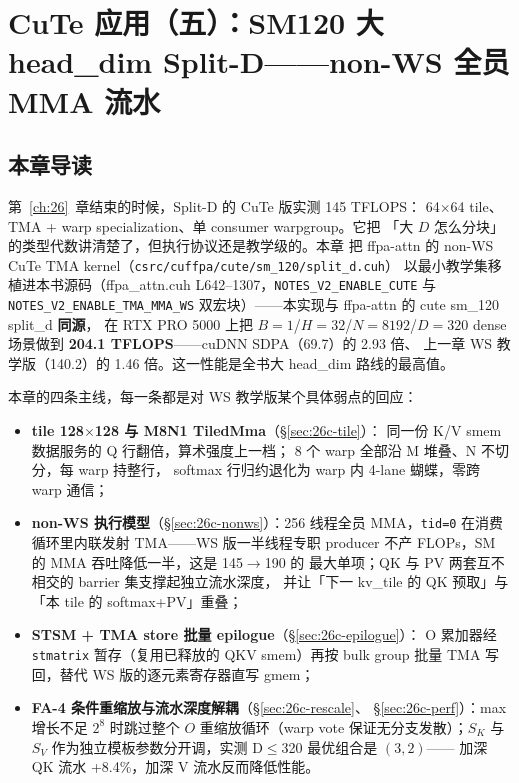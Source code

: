 \chapter{CuTe 应用（五）：SM120 大 head\_dim Split-D——non-WS 全员 MMA 流水}\label{ch:26c}

\section{本章导读}

第~\ref{ch:26}~章结束的时候，Split-D 的 CuTe 版实测 145 TFLOPS：
64$\times$64 tile、TMA + warp specialization、单 consumer warpgroup。它把
「大 $D$ 怎么分块」的类型代数讲清楚了，但执行协议还是教学级的。本章
把 ffpa-attn 的 non-WS CuTe TMA kernel（\texttt{csrc/cuffpa/cute/sm\_120/split\_d.cuh}）
以最小教学集移植进本书源码（ffpa\_attn.cuh L642--1307，\texttt{NOTES\_\allowbreak{}V2\_\allowbreak{}ENABLE\_\allowbreak{}CUTE}
与 \texttt{NOTES\_\allowbreak{}V2\_\allowbreak{}ENABLE\_\allowbreak{}TMA\_\allowbreak{}MMA\_\allowbreak{}WS}
双宏块）——本实现与 ffpa-attn 的 cute sm\_120 split\_d \textbf{同源}，
在 RTX PRO 5000 上把 $B{=}1$/$H{=}32$/$N{=}8192$/$D{=}320$
dense 场景做到 \textbf{204.1 TFLOPS}——cuDNN SDPA（69.7）的 2.93 倍、
上一章 WS 教学版（140.2）的 1.46 倍。这一性能是全书大 head\_dim 路线的最高值。

本章的四条主线，每一条都是对 WS 教学版某个具体弱点的回应：

\begin{itemize}[itemsep=1pt,topsep=2pt]
  \item \textbf{tile 128$\times$128 与 M8N1 TiledMma}（\S\ref{sec:26c-tile}）：
        同一份 K/V smem 数据服务的 Q 行翻倍，算术强度上一档；
        8 个 warp 全部沿 M 堆叠、N 不切分，每 warp 持整行，
        softmax 行归约退化为 warp 内 4-lane 蝴蝶，零跨 warp 通信；
  \item \textbf{non-WS 执行模型}（\S\ref{sec:26c-nonws}）：256 线程全员
        MMA，\texttt{tid=0} 在消费循环里内联发射 TMA——WS 版一半线程专职
        producer 不产 FLOPs，SM 的 MMA 吞吐降低一半，这是 145$\to$190 的
        最大单项；QK 与 PV 两套互不相交的 barrier 集支撑起独立流水深度，
        并让「下一 kv\_tile 的 QK 预取」与「本 tile 的 softmax+PV」重叠；
  \item \textbf{STSM + TMA store 批量 epilogue}（\S\ref{sec:26c-epilogue}）：
        O 累加器经 \texttt{stmatrix} 暂存（复用已释放的 QKV smem）再按
        bulk group 批量 TMA 写回，替代 WS 版的逐元素寄存器直写 gmem；
  \item \textbf{FA-4 条件重缩放与流水深度解耦}（\S\ref{sec:26c-rescale}、
        \S\ref{sec:26c-perf}）：max 增长不足 $2^8$ 时跳过整个
        $O$ 重缩放循环（warp vote 保证无分支发散）；$S_K$ 与 $S_V$
        作为独立模板参数分开调，实测 D$\le$320 最优组合是 $(3,2)$——
        加深 QK 流水 +8.4\%，加深 V 流水反而降低性能。
\end{itemize}

